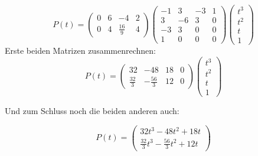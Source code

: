 \begin{displaymath}
P(t) = 
\begin{pmatrix}
0 & 6 & -4 & 2 \\
0 & 4 & \frac{16}{9} & 4
\end{pmatrix}
\begin{pmatrix}
-1 & 3 & -3 & 1 \\
3 & -6 & 3 & 0 \\
-3 & 3 & 0 & 0 \\
1 & 0 & 0 & 0
\end{pmatrix}
\begin{pmatrix}
t^3\\
t^2\\
t\\
1
\end{pmatrix}
\end{displaymath}
Erste beiden Matrizen zusammenrechnen:
\begin{displaymath}
P(t) = 
\begin{pmatrix}
32 & -48 & 18 & 0 \\
\frac{32}{3} & -\frac{56}{3} & 12 & 0
\end{pmatrix}
\begin{pmatrix}
t^3\\
t^2\\
t\\
1
\end{pmatrix}
\end{displaymath}

Und zum Schluss noch die beiden anderen auch:

\begin{displaymath}
P(t) = 
\begin{pmatrix}
32t^3-48t^2+18t\\
\frac{32}{3}t^3 -\frac{56}{3}t^2 + 12t
\end{pmatrix}
\end{displaymath}

